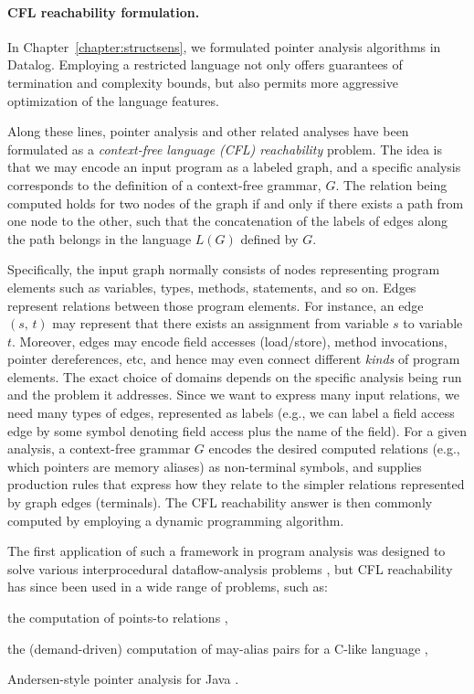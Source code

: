 \paragraph{CFL reachability formulation.} In
Chapter~\ref{chapter:structsens}, we formulated pointer analysis
algorithms in Datalog. Employing a restricted language not only offers
guarantees of termination and complexity bounds, but also permits more
aggressive optimization of the language features.

Along these lines, pointer analysis and other related analyses have
been formulated as a \emph{context-free language (CFL) reachability}
problem. The idea is that we may encode an input program as a labeled
graph, and a specific analysis corresponds to the definition of a
context-free grammar, \(G\). The relation being computed holds for two
nodes of the graph if and only if there exists a path from one node to
the other, such that the concatenation of the labels of edges along
the path belongs in the language \(L(G)\) defined by \(G\).

Specifically, the input graph normally consists of nodes representing
program elements such as variables, types, methods, statements, and so
on. Edges represent relations between those program elements. For
instance, an edge \((s,\,t)\) may represent that there exists an
assignment from variable \(s\) to variable \(t\). Moreover, edges may
encode field accesses (load/store), method invocations, pointer
dereferences, etc, and hence may even connect different \emph{kinds}
of program elements. The exact choice of domains depends on the
specific analysis being run and the problem it addresses. Since we
want to express many input relations, we need many types of edges,
represented as labels (e.g., we can label a field access edge by some
symbol denoting field access plus the name of the field).  For a given
analysis, a context-free grammar \(G\) encodes the desired computed
relations (e.g., which pointers are memory aliases) as non-terminal
symbols, and supplies production rules that express how they relate to
the simpler relations represented by graph edges (terminals). The CFL
reachability answer is then commonly computed by employing a dynamic
programming algorithm.

The first application of such a framework in program analysis was
designed to solve various interprocedural dataflow-analysis problems
\cite{popl/RepsHS95}, but CFL reachability has since been used in a
wide range of problems, such as:
\begin{inparaenum}[(i)]
\item the computation of points-to relations
  \cite{journals/infsof/Reps98},
\item the (demand-driven) computation of may-alias pairs for a C-like
  language \cite{popl/ZhengR08},
\item Andersen-style pointer analysis for Java
  \cite{oopsla/SridharanGSB05}.
\end{inparaenum}


